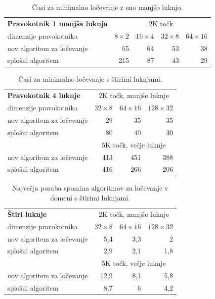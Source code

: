 \documentclass[a4paper, 12pt]{book}
\begin{document}
\begin{table}[htp]
\begin{center}
\begin{tabular}{l*{4}{r}}
\textbf{Pravokotnik 1 manjša luknja} & \multicolumn{4}{c}{2K točk}\\
dimenzije pravokotnika	&	$8\times 2$	&	$16\times 4$	&	$32\times 8$ & $64\times 16$ \\	
\hline
nov algoritem za ločevanje	&	65	&	64	&	53	&	38  \\
splošni algoritem			&	215	&	87	&	43	&	29
\end{tabular}
\caption{Časi za minimalno ločevanje z eno manjšo luknjo.}
\label{table6}
\end{center}
\end{table}

\begin{table}[htp]
\begin{center}
\begin{tabular}{l*{3}{r}}
\textbf{Pravokotnik 4 luknje} & \multicolumn{3}{c}{2K točk, manjše luknje} \\
dimenzije pravokotnika	&	$32\times 8$ &	$64\times 16$ & $128\times 32$ \\	
\hline
nov algoritem za ločevanje	&	29	&	35	&	35	\\
splošni algoritem			&	80	&	40	&	30	\\
\hline
& \multicolumn{3}{c}{5K točk, večje luknje} \\
\hline
nov algoritem za ločevanje &	413 & 451 & 388  \\
splošni algoritem &	416 & 266 & 206
\end{tabular}
\caption{Časi za minimalno ločevanje s štirimi luknjami.}
\label{table7}
\end{center}
\end{table}

\begin{table}
\begin{center}
\begin{tabular}{l*{3}{r}}
\textbf{Štiri luknje} & \multicolumn{3}{c}{2K točk, manjše luknje}\\						
dimenzije pravokotnika	&	$32\times 8$	&	$64\times 16$	&	$128\times 32$	\\
\hline
nov algoritem za ločevanje	&	5,4	&	3,3	&	2		\\
splošni algoritem	&	2,9	&	2,1	&	1,8	\vspace{.2cm}	\\
\hline
& \multicolumn{3}{c}{5K točk, večje luknje} \\
\hline
nov algoritem za ločevanje	& 12,9	&	8,1	&	5,8		\\
splošni algoritem	&	8,7	&	6	&	4,2	\vspace{.2cm}	\\
\end{tabular}
\caption{Največja poraba spomina algoritmov za ločevanje v domeni s štirimi luknjami.}
\label{table-ram-sep}
\end{center}
\end{table}
\end{document}
